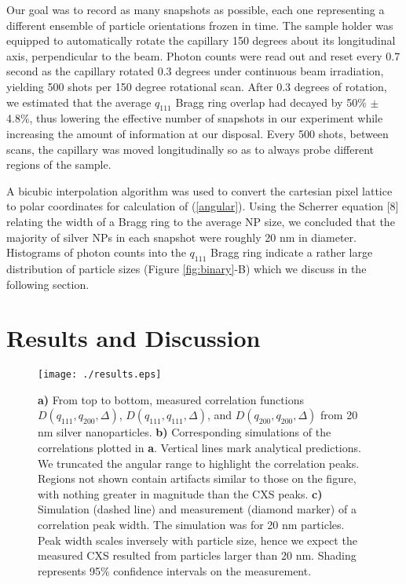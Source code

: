 \documentclass [11pt,fleqn]{article}
\begin{document}
Our goal was to record as many snapshots as possible, each one representing a different ensemble of particle orientations frozen in time. The sample holder was equipped to automatically rotate the capillary 150 degrees about its longitudinal axis, perpendicular to the beam. Photon counts were read out and reset every 0.7 second as the capillary rotated 0.3 degrees under continuous beam irradiation, yielding 500 shots per 150 degree rotational scan. After 0.3 degrees of rotation, we estimated that the average $q_{111}$ Bragg ring overlap had decayed by 50\% $\pm$ 4.8\%, thus lowering the effective number of snapshots in our experiment while increasing the amount of information at our disposal. Every 500 shots, between scans, the capillary was moved longitudinally so as to always probe different regions of the sample.

A bicubic interpolation algorithm was used to convert the cartesian pixel lattice to polar coordinates for calculation of (\ref{angular}). Using the Scherrer equation [8] relating the width of a Bragg ring to the average NP size, we concluded that the majority of silver NPs in each snapshot were roughly 20 nm in diameter. Histograms of photon counts into the $q_{111}$ Bragg ring indicate a rather large distribution of particle sizes (Figure \ref{fig:binary}-B) which we discuss in the following section.

\section{Results and Discussion}


\begin{figure}
\begin{center}
\texttt{[image: ./results.eps]}
\end{center}
\caption{ {\bf a)} From top to bottom, measured correlation functions $D (q_{111},q_{200}, \Delta  )$, $D (q_{111},q_{111}, \Delta  )$, and $D (q_{200},q_{200}, \Delta  )$ from 20 nm silver nanoparticles. {\bf b)} Corresponding simulations of the correlations plotted in {\bf a}. Vertical lines mark analytical predictions. We truncated the angular range to highlight the correlation peaks. Regions not shown contain artifacts similar to those on the figure, with nothing greater in magnitude than the CXS peaks. {\bf c)} Simulation (dashed line) and measurement (diamond marker) of a correlation peak width. The simulation was for 20 nm particles. Peak width scales inversely with particle size, hence we expect the measured CXS resulted from particles larger than 20 nm. Shading represents 95\% confidence intervals on the measurement. }
\label{fig:results}
\end{figure}
\end{document}

